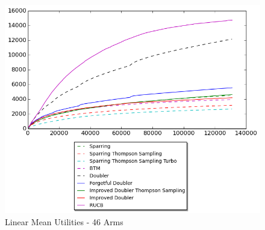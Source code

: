 \documentclass[MSc,beforeExam]{iitcsthesis}
\begin{document}
\newpage
\begin{figure}[h!]
\centering
  \includegraphics[scale=0.8]{graphs/linear_arm_46.png}
  \caption{Linear Mean Utilities - 46 Arms}
\end{figure}
\newpage
\end{document}
